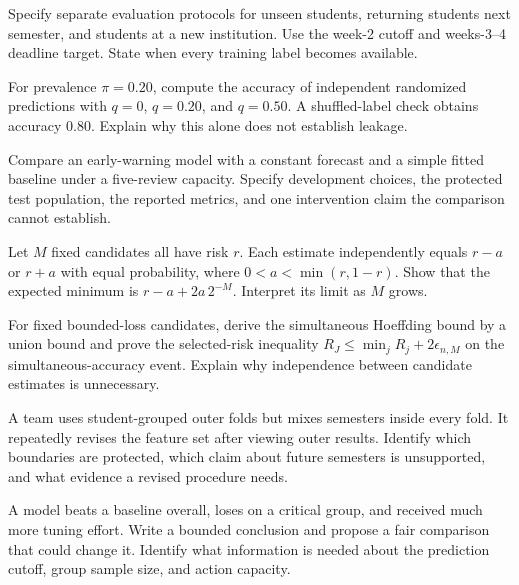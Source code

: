 \begin{exercises}
\item {}Specify separate evaluation protocols for unseen students, returning students next semester, and students at a new institution. Use the week-2 cutoff and weeks-3--4 deadline target. State when every training label becomes available.
\item {}For prevalence $\pi=0.20$, compute the accuracy of independent randomized predictions with $q=0$, $q=0.20$, and $q=0.50$. A shuffled-label check obtains accuracy $0.80$. Explain why this alone does not establish leakage.
\item {}Compare an early-warning model with a constant forecast and a simple fitted baseline under a five-review capacity. Specify development choices, the protected test population, the reported metrics, and one intervention claim the comparison cannot establish.
\end{exercises}

\par\noindent\begin{minipage}{\linewidth}
\begin{challengeexercises}
\item {}Let $M$ fixed candidates all have risk $r$. Each estimate independently equals $r-a$ or $r+a$ with equal probability, where $0<a<\min(r,1-r)$. Show that the expected minimum is $r-a+2a\,2^{-M}$. Interpret its limit as $M$ grows.
\item {}For fixed bounded-loss candidates, derive the simultaneous Hoeffding bound by a union bound and prove the selected-risk inequality $R_J\le\min_j R_j+2\epsilon_{n,M}$ on the simultaneous-accuracy event. Explain why independence between candidate estimates is unnecessary.
\item {}A team uses student-grouped outer folds but mixes semesters inside every fold. It repeatedly revises the feature set after viewing outer results. Identify which boundaries are protected, which claim about future semesters is unsupported, and what evidence a revised procedure needs.
\item {}A model beats a baseline overall, loses on a critical group, and received much more tuning effort. Write a bounded conclusion and propose a fair comparison that could change it. Identify what information is needed about the prediction cutoff, group sample size, and action capacity.
\end{challengeexercises}
\end{minipage}
\clearpage
\begingroup\pagestyle{empty}\cleardoublepage\endgroup
\endgroup
